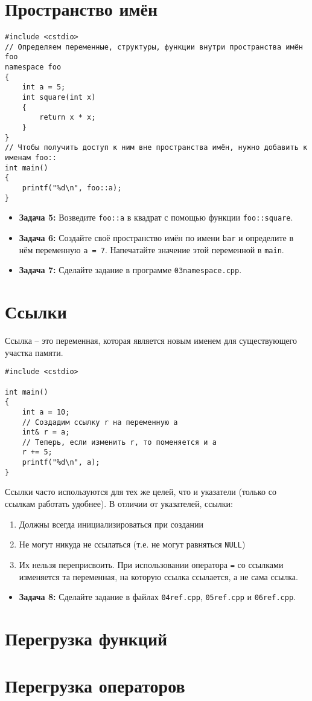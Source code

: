 \documentclass{article}
\begin{document}
\section*{Пространство имён}
\begin{lstlisting}
#include <cstdio>
// Определяем переменные, структуры, функции внутри пространства имён foo
namespace foo
{
	int a = 5;
	int square(int x)
	{
		return x * x;
	}
}
// Чтобы получить доступ к ним вне пространства имён, нужно добавить к именам foo::
int main()
{
	printf("%d\n", foo::a);
}
\end{lstlisting}
\begin{itemize}
\item \textbf{Задача 5:} Возведите \texttt{foo::a} в квадрат с помощью функции \texttt{foo::square}. 
\item \textbf{Задача 6:} Создайте своё пространство имён по имени \texttt{bar} и определите в нём переменную \texttt{a = 7}. Напечатайте значение этой переменной в \texttt{main}.
\item \textbf{Задача 7:} Сделайте задание в программе \texttt{03namespace.cpp}.
\end{itemize}

\section*{Ссылки}
Ссылка -- это переменная, которая является новым именем для существующего участка памяти. 
\begin{lstlisting}
#include <cstdio>

int main()
{
	int a = 10;
	// Создадим ссылку r на переменную a
	int& r = a;
	// Теперь, если изменить r, то поменяется и a
	r += 5;
	printf("%d\n", a);
}
\end{lstlisting}
Ссылки часто используются для тех же целей, что и указатели (только со ссылкам работать удобнее).
В отличии от указателей, ссылки:
\begin{enumerate}
\item Должны всегда инициализироваться при создании
\item Не могут никуда не ссылаться (т.е. не могут равняться \texttt{NULL})
\item Их нельзя переприсвоить. При использовании оператора \texttt{=} со ссылками изменяется та переменная, на которую ссылка ссылается, а не сама ссылка.
\end{enumerate}
\begin{itemize}
\item \textbf{Задача 8:} Сделайте задание в файлах \texttt{04ref.cpp}, \texttt{05ref.cpp} и \texttt{06ref.cpp}.
\end{itemize}
\section*{Перегрузка функций}

\section*{Перегрузка операторов}
\end{document}

